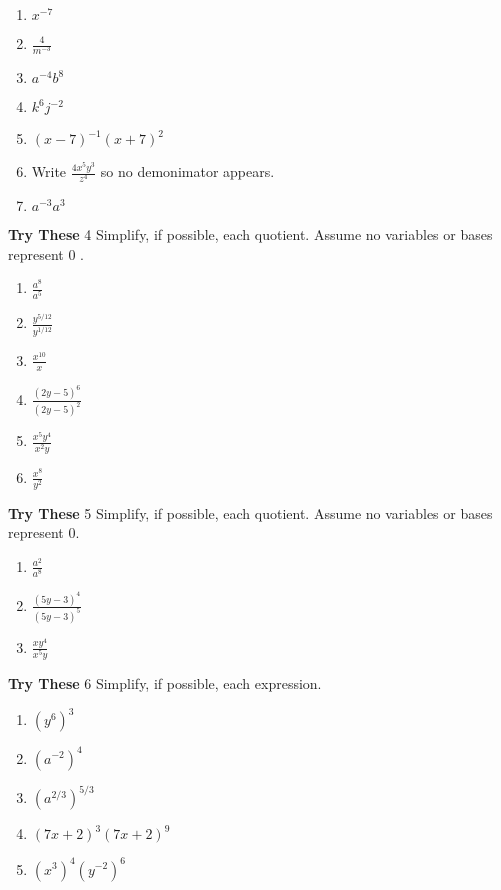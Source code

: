 \documentclass[a4paper]{JAC2003}
\begin{document}
\begin{enumerate}
\item $x^{-7}$

\item $\frac{4}{m^{-3}}$

\item $a^{-4} b^{8}$

\item $k^{6} j^{-2}$

\item $(x-7)^{-1}(x+7)^{2}$

\item Write $\frac{4 x^{5} y^{3}}{z^{4}}$ so no demonimator appears.
\item $a^{-3} a^{3}$
\end{enumerate}

\noindent\textcolor{red!75!black}{\textbf{Try These}} 4 Simplify, if possible, each quotient. Assume no variables or bases represent 0 .

\begin{enumerate}
\item $\frac{a^{8}}{a^{5}}$

\item $\frac{y^{5 / 12}}{y^{1 / 12}}$

\item $\frac{x^{10}}{x}$

\item $\frac{(2 y-5)^{6}}{(2 y-5)^{2}}$

\item $\frac{x^{5} y^{4}}{x^{2} y}$

\item $\frac{x^{8}}{y^{2}}$
\end{enumerate}

\noindent\textcolor{red!75!black}{\textbf{Try These}} 5 Simplify, if possible, each quotient. Assume no variables or bases represent 0.

\begin{enumerate}
\item $\frac{a^{2}}{a^{8}}$

\item $\frac{(5 y-3)^{4}}{(5 y-3)^{5}}$

\item $\frac{x y^{4}}{x^{5} y}$
\end{enumerate}

\noindent\textcolor{red!75!black}{\textbf{Try These}} 6 Simplify, if possible, each expression.

\begin{enumerate}
\item $\left(y^{6}\right)^{3}$

\item $\left(a^{-2}\right)^{4}$

\item $\left(a^{2 / 3}\right)^{5 / 3}$

\item $(7 x+2)^{3}(7 x+2)^{9}$

\item $\left(x^{3}\right)^{4}\left(y^{-2}\right)^{6}$
\end{enumerate}
\end{document}
